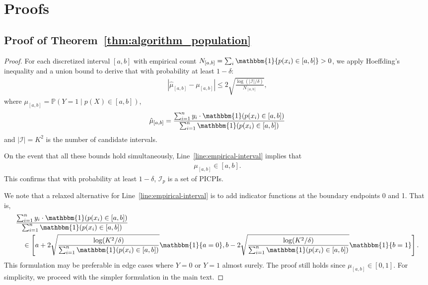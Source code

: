\documentclass[11pt]{article}
\theoremstyle{statplain}
\theoremstyle{statdefinition}
\newcommand{\PP}{\mathbb{P}}
\newcommand{\0}{\mathbf{0}}
\newcommand{\I}{\mathcal{I}}
\providecommand{\xuelinbibstyle}{plainnat}
\newcommand{\intervalset}{\I} %
\newcommand{\failureProb}{\delta} %
\newcommand{\discreteNum}{K} %
\newcommand{\titleShorts}{PICPIs\xspace}
\begin{document}
\clearpage



\clearpage
\appendix
\section{Proofs}

\subsection{Proof of Theorem~\ref{thm:algorithm_population}}
\label{proof_thm:algorithm_population}

\begin{proof}

For each discretized interval $[a, b]$ with empirical count $N_{[a,b]} = \sum_i \mathbbm{1}\{p(x_i) \in [a,b]\} > 0$, we apply Hoeffding's inequality and a union bound to derive that with probability at least $1-\delta$:
\begin{align*}
    |\hat{\mu}_{[a,b]} - \mu_{[a,b]}| \leq 2\sqrt{\frac{\log(|\mathcal{I}|/\delta)}{N_{[a,b]}}},
\end{align*}
where $\mu_{[a,b]} = \PP(Y=1 \mid p(X) \in [a, b])$,
\begin{align*}
    \hat{\mu}_{[a,b]} = \frac{\sum_{i=1}^n y_i \cdot \mathbbm{1}(p(x_i) \in [a,b])}{\sum_{i=1}^n \mathbbm{1}(p(x_i) \in [a,b])}
\end{align*}
and $|\mathcal{I}| = K^2$ is the number of candidate intervals.

On the event that all these bounds hold simultaneously, Line~\ref{line:empirical-interval} implies that
\begin{align*}
    \mu_{[a,b]} \in [a,b].
\end{align*}
This confirms that with probability at least $1-\failureProb$, $\intervalset_p$ is a set of \titleShorts.

We note that a relaxed alternative for Line~\ref{line:empirical-interval} is to add indicator functions at the boundary endpoints 0 and 1. That is, 
{
\begin{align}
    & \frac{\sum_{i=1}^n y_i \cdot \mathbbm{1}(p(x_i) \in [a,b])}{\sum_{i=1}^n \mathbbm{1}(p(x_i) \in [a,b])} \nonumber\\
    &\quad \in \left[a + 2\sqrt{\frac{\log (\discreteNum^2/\delta)}{\sum_{i=1}^n \mathbbm{1}(p(x_i) \in [a,b])}} \mathbbm{1}\{a=0\} ,b - 2\sqrt{\frac{\log (\discreteNum^2/\delta)}{\sum_{i=1}^n \mathbbm{1}(p(x_i) \in [a,b])}}\mathbbm{1}\{b=1\}\right].
\end{align}} 
This formulation may be preferable in edge cases where $Y=0$ or $Y=1$ almost surely. The proof still holds since $\mu_{[a,b]}\in[0,1]$. For simplicity, we proceed with the simpler formulation in the main text.
\end{proof}
\end{document}
